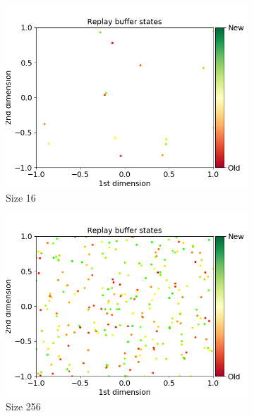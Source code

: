 \documentclass{article}
\begin{document}
\begin{figure}[H]
  \centering
  \begin{subfigure}[b]{0.3\linewidth}
    \includegraphics[width=\linewidth]{Study_1/buffer/uniform_16.png}
    \caption{Size 16}
  \end{subfigure}
  \begin{subfigure}[b]{0.3\linewidth}
    \includegraphics[width=\linewidth]{Study_1/buffer/uniform_256.png}
      \caption{Size 256}
  \end{subfigure}
   \begin{subfigure}[b]{0.3\linewidth}

\end{subfigure}
\end{figure}
\end{document}
